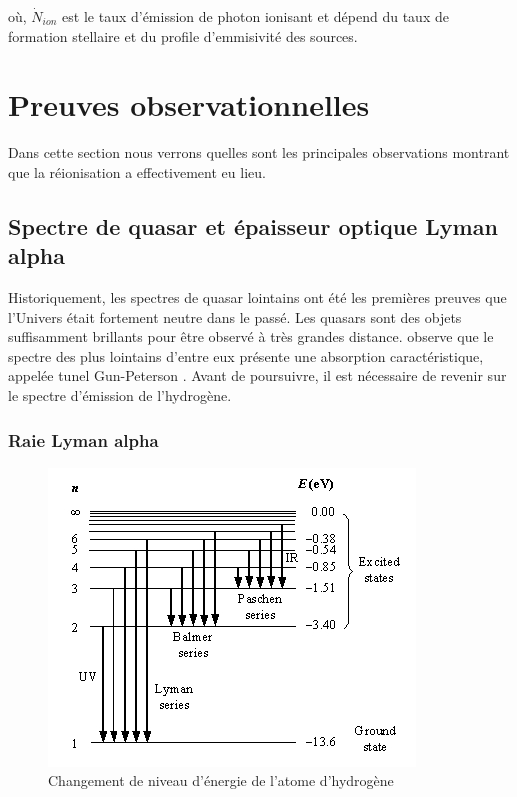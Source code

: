 où, $\dot{N}_{ion}$  est le taux d'émission de photon ionisant et dépend du taux de formation stellaire et du profile d'emmisivité des sources.

\section{Preuves observationnelles}
\label{sec_contraintes_obs}

Dans cette section nous verrons quelles sont les principales observations montrant que la réionisation a effectivement eu lieu.

\subsection{Spectre de quasar et épaisseur optique Lyman alpha}

Historiquement, les spectres de quasar lointains ont été les premières preuves que l'Univers était fortement neutre dans le passé.
Les quasars sont des objets suffisamment brillants pour être observé à très grandes distance.
\citep{1965ApJ...141.1295S} observe que le spectre des plus lointains d'entre eux présente une absorption caractéristique, appelée tunel Gun-Peterson \citep{1965ApJ...142.1633G}.
Avant de poursuivre, il est nécessaire  de revenir sur le spectre d’émission de l’hydrogène.

\subsubsection*{Raie Lyman alpha}

\begin{figure}
\centering
        \includegraphics[width=.9\textwidth]{img/01/lyman.jpg} 
        \caption[Raies de l'hydrogène]{Changement de niveau d'énergie de l'atome d'hydrogène}
 		\label{fig:lyman}
\end{figure}

